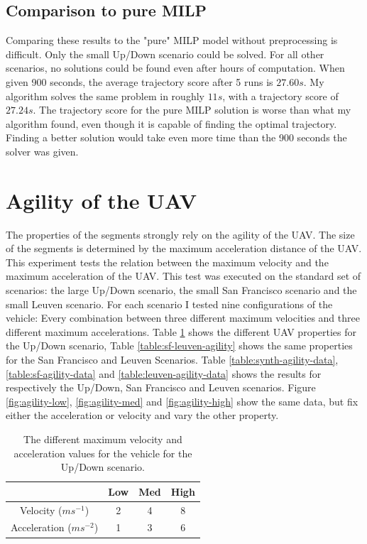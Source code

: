 \subsection{Comparison to pure MILP}
Comparing these results to the "pure" MILP model without preprocessing is difficult. Only the small Up/Down scenario could be solved. For all other scenarios, no solutions could be found even after hours of computation. When given 900 seconds, the average trajectory score after 5 runs is $27.60s$. My algorithm solves the same problem in roughly $11s$, with a trajectory score of $27.24s$. The trajectory score for the pure MILP solution is worse than what my algorithm found, even though it is capable of finding the optimal trajectory. Finding a better solution would take even more time than the 900 seconds the solver was given.
\clearpage
\section{Agility of the UAV}
\label{subsec:agility}
The properties of the segments strongly rely on the agility of the UAV. The size of the segments is determined by the maximum acceleration distance of the UAV. \\
This experiment tests the relation between the maximum velocity and the maximum acceleration of the UAV. This test was executed on the standard set of scenarios: the large Up/Down scenario, the small San Francisco scenario and the small Leuven scenario. For each scenario I tested nine configurations of the vehicle: Every combination between three different maximum velocities and three different maximum accelerations. Table \ref{table:synth-agility} shows the different UAV properties for the Up/Down scenario, Table \ref{table:sf-leuven-agility} shows the same properties for the San Francisco and Leuven Scenarios. Table \ref{table:synth-agility-data}, \ref{table:sf-agility-data} and \ref{table:leuven-agility-data} shows the results for respectively the Up/Down, San Francisco and Leuven scenarios. Figure \ref{fig:agility-low}, \ref{fig:agility-med} and \ref{fig:agility-high} show the same data, but fix either the acceleration or velocity and vary the other property. \\

\begin{table}[h]
\centering
\begin{tabular}{ c || c | c | c}
 & Low & Med & High \\
\hline\hline
Velocity ($ms^{-1}$) 	& 2		& 4		& 8 	\\ 
\hline
Acceleration ($ms^{-2}$)& 1		& 3 	& 6 	\\  
\end{tabular}
\caption{The different maximum velocity and acceleration values for the vehicle for the Up/Down scenario.}
\label{table:synth-agility}
\end{table}

